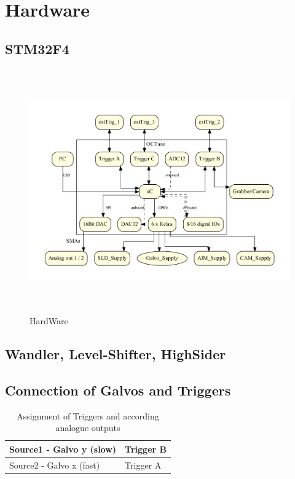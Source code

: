 \documentclass[master,english,smartquotes,apa]{hgbthesis}
\begin{document}
		\section{Hardware}
			\subsection{STM32F4}
			\begin{figure}[ht]
				\centering
				\includegraphics[height=105mm]{src/_Octane_HW-Structure.pdf}
				\caption{HardWare}
				\label{_Octane_HW-Structure.pdf}
			\end{figure}
			
			\subsection{Wandler, Level-Shifter, HighSider}
			\subsection{Connection of Galvos and Triggers}
				\begin{table}[h!]
					 \begin{tabular}{|p{5.5cm}|p{6cm}|} \hline
					Source1	- Galvo y (slow)& Trigger B\\ \hline
					Source2	- Galvo x (fast)& Trigger A\\ \hline
					 \end{tabular}
					 \caption{Assignment of Triggers and according analogue outputs}
				\end{table}
\end{document}
